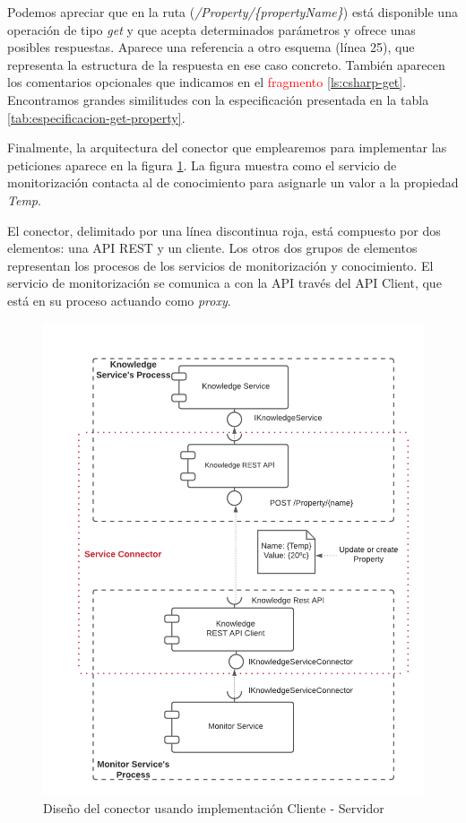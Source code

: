 Podemos apreciar que en la ruta (\textit{/Property/\{propertyName\}}) está disponible una operación de tipo \textit{get} y que acepta determinados parámetros y ofrece unas posibles respuestas. Aparece una referencia a otro esquema (línea 25), que representa la estructura de la respuesta en ese caso concreto. También aparecen los comentarios opcionales que indicamos en el \textcolor{red}{fragmento} \ref{ls:csharp-get}. Encontramos grandes similitudes con la especificación presentada en la tabla \ref{tab:especificacion-get-property}.

Finalmente, la arquitectura del conector que emplearemos para implementar las peticiones aparece en la figura \ref{fig:monitor-knowledge-connector-architecture}. La figura muestra como el servicio de monitorización contacta al de conocimiento para asignarle un valor a la propiedad \textit{Temp}.

El conector, delimitado por una línea discontinua roja, está compuesto por dos elementos: una API REST y un cliente. Los otros dos grupos de elementos representan los procesos de los servicios de monitorización y conocimiento. El servicio de monitorización se comunica a con la API través del API Client, que está en su proceso actuando como \textit{proxy}.

\begin{figure}[htb]
  \centering
  \includegraphics[scale=0.8]{02_arquitectura/images/Monitor-Knowledge-Connector}
  \caption{Diseño del conector usando implementación Cliente - Servidor}
  \label{fig:monitor-knowledge-connector-architecture}
\end{figure}
